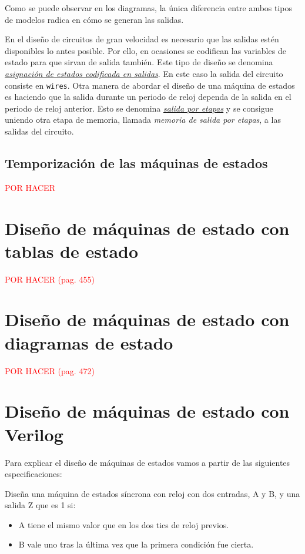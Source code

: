 Como se puede observar en los diagramas, la única diferencia entre ambos tipos de modelos radica en cómo se generan las salidas. 

En el diseño de circuitos de gran velocidad es necesario que las salidas estén disponibles lo antes posible. Por ello, en ocasiones se codifican las variables de estado para que sirvan de salida también. Este tipo de diseño se denomina \hyperlink{output-coded_state_assignment}{\emph{asignación de estados codificada en salidas}}. En este caso la salida del circuito consiste en \verb|wires|. Otra manera de abordar el diseño de una máquina de estados es haciendo que la salida durante un periodo de reloj dependa de la salida en el periodo de reloj anterior. Esto se denomina \hyperlink{pipelined_outputs}{\emph{salida por etapas}} y se consigue uniendo otra etapa de memoria, llamada \emph{memoria de salida por etapas}, a las salidas del circuito.

\subsection{Temporización de las máquinas de estados}

\textcolor{red}{POR HACER}

\section{Diseño de máquinas de estado con tablas de estado}

\textcolor{red}{POR HACER (pag. 455)}

\section{Diseño de máquinas de estado con diagramas de estado}

\textcolor{red}{POR HACER (pag. 472)}

\section{Diseño de máquinas de estado con Verilog}

Para explicar el diseño de máquinas de estados vamos a partir de las siguientes especificaciones:

Diseña una máquina de estados síncrona con reloj con dos entradas, A y B, y una salida Z que es 1 si:

\begin{itemize}
    \item A tiene el mismo valor que en los dos tics de reloj previos.
    \item B vale uno tras la última vez que la primera condición fue cierta.
\end{itemize}

